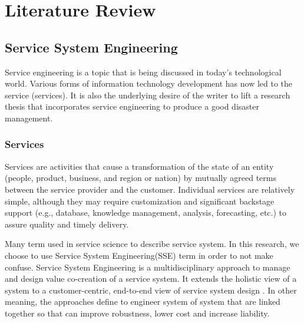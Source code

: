 \chapter{Literature Review}
\section{Service System Engineering}
Service engineering is a topic that is being discussed in today's technological world. Various forms of information technology development has now led to the service (services). It is also the underlying desire of the writer to lift a research thesis that incorporates service engineering to produce a good disaster management.\par

\subsection{Services}
\label{sebsec: ServicesDefinition}
Services are activities that cause a transformation of the state of an entity (people, product, business, and region or nation) by mutually agreed terms between the service provider and the customer. Individual services are relatively simple, although they may require customization and significant backstage support (e.g., database, knowledge management, analysis, forecasting, etc.) to assure quality and timely delivery. \par
Many term used in service science to describe service system. In this research, we choose to use Service System Engineering(SSE) term in order to not make confuse. Service System Engineering is a multidisciplinary approach to manage and design value co-creation of a service system. It extends the holistic view of a system to a customer-centric, end-to-end view of service system design \cite{SSEDefinition}. In other meaning, the approaches define to engineer system of system that are linked together so that can improve robustness, lower cost and increase liability. \par
\begin{comment}
	servvis adalah segala bentuk aktivitas yang mengtranformasi atau meubah bentuk dari sebuah entitas seperti masyarakat, procukatau bisnis dengan sebuah bentuk kepercayaan bersama antara si penyedia service atu layanan dengan si kostumer.
	
	sedangkan rekayasa sistem layanan adalah pendekatan-pendekatan yang yang diberikan untuk mengatur atau mendesain sebuah nilai dari sebuah sistem layanan. atau boleh dikatakan sebuah pendekatan untuk merekayasa sebuah sistem layanan untuk mendepatkan  tingkat ketahanan sistem yang lebih baik, mengurangi biaya dan meningkatkan kekuatan sistem.
	
	liability artinya bertanggung jawab, kecenderungan atau kekurangan
\end{comment}

